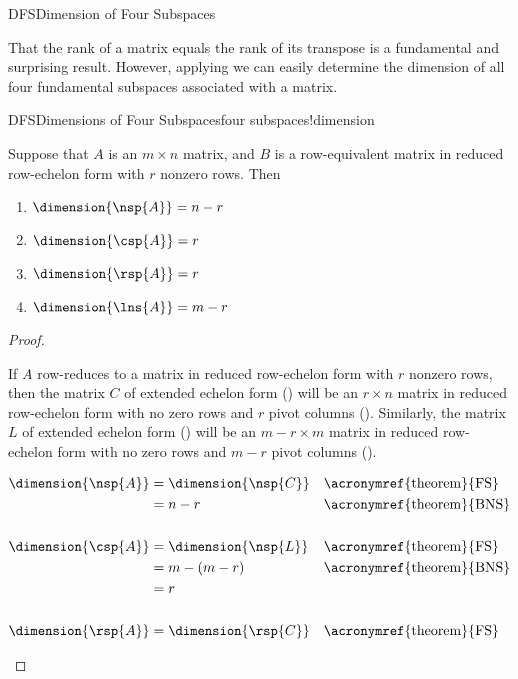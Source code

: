\begin{subsect}{DFS}{Dimension of Four Subspaces}
%
\begin{para}That the rank of a matrix equals the rank of its transpose is a fundamental and surprising result.  However, applying  we can easily determine the dimension of all four fundamental subspaces associated with a matrix.\end{para}
%
\begin{theorem}{DFS}{Dimensions of Four Subspaces}{four subspaces!dimension}
\begin{para}Suppose that $A$ is an $m\times n$ matrix, and $B$ is a row-equivalent matrix in reduced row-echelon form with $r$ nonzero rows.  Then
\begin{enumerate}
\item $\dimension{\nsp{A}}=n-r$
\item $\dimension{\csp{A}}=r$
\item $\dimension{\rsp{A}}=r$
\item $\dimension{\lns{A}}=m-r$
\end{enumerate}
\end{para}
\end{theorem}
%
\begin{proof}
\begin{para}If $A$ row-reduces to a matrix in reduced row-echelon form with $r$ nonzero rows, then the matrix $C$ of extended echelon form () will be an $r\times n$ matrix in reduced row-echelon form with no zero rows and $r$ pivot columns ().  Similarly, the matrix $L$ of extended echelon form () will be an $m-r\times m$ matrix in reduced row-echelon form with no zero rows and $m-r$ pivot columns ().\end{para}
%
\begin{para}
\begin{align*}
%
\dimension{\nsp{A}}
&=\dimension{\nsp{C}}&&\text{\acronymref{theorem}{FS}}\\
&=n-r&&\text{\acronymref{theorem}{BNS}}\\
\ \\
\dimension{\csp{A}}
&=\dimension{\nsp{L}}&&\text{\acronymref{theorem}{FS}}\\
&=m-(m-r)&&\text{\acronymref{theorem}{BNS}}\\
&=r\\
\ \\
\dimension{\rsp{A}}
&=\dimension{\rsp{C}}&&\text{\acronymref{theorem}{FS}}\\

\end{align*}
\end{para}
\end{proof}
\end{subsect}
